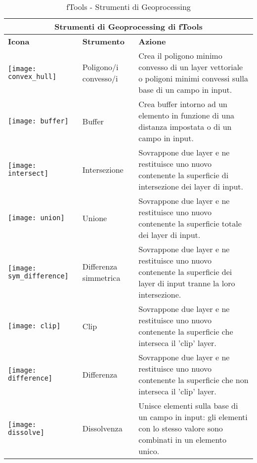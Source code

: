 \begin{table}[ht]
\centering
 \begin{tabular}{|m{1cm}|m{3cm}|m{12cm}|}
 \hline \multicolumn{3}{|c|}{\textbf{Strumenti di Geoprocessing di fTools}} \\
 \hline \textbf{Icona} & \textbf{Strumento} & \textbf{Azione} \\
 \hline \texttt{[image: convex\_hull]} & Poligono/i convesso/i & Crea il poligono 
minimo convesso di un layer vettoriale o poligoni minimi convessi sulla base di un campo in input. \\
 \hline \texttt{[image: buffer]} & Buffer & Crea buffer intorno ad un elemento 
in funzione di una distanza impostata o di un campo in input. \\
 \hline \texttt{[image: intersect]} & Intersezione & Sovrappone due layer e 
ne restituisce uno nuovo contenente la superficie di intersezione dei layer di input. \\
 \hline \texttt{[image: union]} & Unione & Sovrappone due layer e 
ne restituisce uno nuovo contenente la superficie totale dei layer di input. \\
 \hline \texttt{[image: sym\_difference]} & Differenza simmetrica & 
Sovrappone due layer e ne restituisce uno nuovo contenente la superficie dei layer di input
tranne la loro intersezione. \\

 \hline \texttt{[image: clip]} & Clip & Sovrappone due layer e 
ne restituisce uno nuovo contenente la superficie che interseca il 'clip' layer. \\
 \hline \texttt{[image: difference]} & Differenza & Sovrappone due layer e 
ne restituisce uno nuovo contenente la superficie che non interseca il 'clip' layer. \\
 \hline \texttt{[image: dissolve]} & Dissolvenza & Unisce elementi sulla 
base di un campo in input: gli elementi con lo stesso valore sono combinati in un 
elemento unico. \\
 \hline
\end{tabular}
\caption{fTools - Strumenti di Geoprocessing}\label{tab:ftool_geoprocessing}
\end{table}

